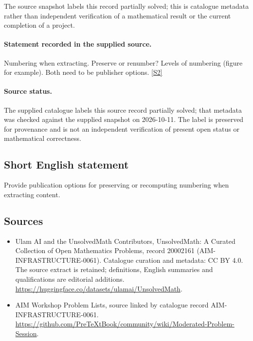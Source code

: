 \documentclass[11pt]{article}
\begin{document}
The source snapshot labels this record partially solved; this is catalogue metadata rather than independent verification of a mathematical result or the current completion of a project.
\paragraph{Statement recorded in the supplied source.}
Numbering when extracting. Preserve or renumber? Levels of numbering (figure for example). Both need to be publisher options. \href{https://github.com/PreTeXtBook/community/wiki/Moderated-Problem-Session}{[S2]}
\paragraph{Source status.}
The supplied catalogue labels this source record partially solved; that metadata was checked against the supplied snapshot on 2026-10-11. The label is preserved for provenance and is not an independent verification of present open status or mathematical correctness.
\subsection{Short English statement}
Provide publication options for preserving or recomputing numbering when extracting content.
\subsection{Sources}
\begin{itemize}
\item[S1] Ulam AI and the UnsolvedMath Contributors, UnsolvedMath: A Curated Collection of Open Mathematics Problems, record 20002161 (AIM-INFRASTRUCTURE-0061). Catalogue curation and metadata: CC BY 4.0. The source extract is retained; definitions, English summaries and qualifications are editorial additions.
\url{https://huggingface.co/datasets/ulamai/UnsolvedMath}.
\item[S2] AIM Workshop Problem Lists, source linked by catalogue record AIM-INFRASTRUCTURE-0061.
\url{https://github.com/PreTeXtBook/community/wiki/Moderated-Problem-Session}.
\end{itemize}
\end{document}
